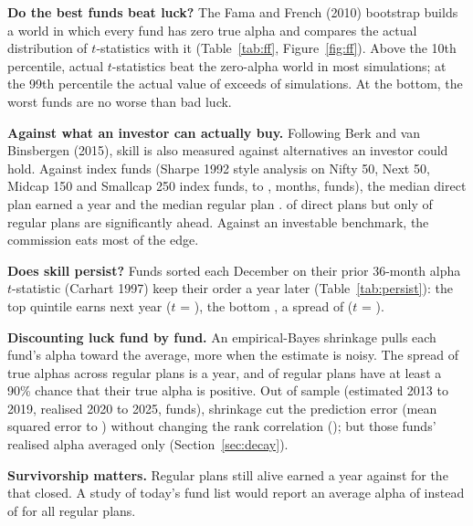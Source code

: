 \documentclass[11pt]{article}
\begin{document}
\textbf{Do the best funds beat luck?} The Fama and French (2010) bootstrap builds a world in which every fund has zero true alpha and compares the actual distribution of $t$-statistics with it (Table~\ref{tab:ff}, Figure~\ref{fig:ff}). Above the 10th percentile, actual $t$-statistics beat the zero-alpha world in most simulations; at the 99th percentile the actual value of \SkillFfRegPNineNineT{} exceeds \SkillFfRegPNineNineShareBelow{} of simulations. At the bottom, the worst funds are no worse than bad luck.

\textbf{Against what an investor can actually buy.} Following Berk and van Binsbergen (2015), skill is also measured against alternatives an investor could hold. Against index funds (Sharpe 1992 style analysis on Nifty 50, Next 50, Midcap 150 and Smallcap 250 index funds, \StyleStart{} to \StyleEnd, \StyleMonths{} months, \StyleDirFunds{} funds), the median direct plan earned \StyleDirMedianAlpha{} a year and the median regular plan \StyleRegMedianAlpha. \StyleDirShareSigPos{} of direct plans but only \StyleRegShareSigPos{} of regular plans are significantly ahead. Against an investable benchmark, the commission eats most of the edge.

\textbf{Does skill persist?} Funds sorted each December on their prior 36-month alpha $t$-statistic (Carhart 1997) keep their order a year later (Table~\ref{tab:persist}): the top quintile earns \SkillPersistTopAlpha{} next year ($t$ = \SkillPersistTopT), the bottom \SkillPersistBottomAlpha, a spread of \SkillPersistSpreadAlpha{} ($t$ = \SkillPersistSpreadT).

\textbf{Discounting luck fund by fund.} An empirical-Bayes shrinkage pulls each fund's alpha toward the average, more when the estimate is noisy. The spread of true alphas across regular plans is \SkillRegEbTau{} a year, and \SkillRegEbShareProbNineZero{} of regular plans have at least a 90\% chance that their true alpha is positive. Out of sample (estimated 2013 to 2019, realised 2020 to 2025, \SkillDirOosFunds{} funds), shrinkage cut the prediction error (mean squared error \SkillDirOosMseRaw{} to \SkillDirOosMseShrunk) without changing the rank correlation (\SkillDirOosRhoRaw); but those funds' realised alpha averaged only \SkillDirOosMeanLaterAlpha{} (Section~\ref{sec:decay}).

\textbf{Survivorship matters.} Regular plans still alive earned \SkillRegAlphaAlive{} a year against \SkillRegAlphaDead{} for the \SkillRegDeadFunds{} that closed. A study of today's fund list would report an average alpha of \SkillRegAlphaAlive{} instead of \SkillRegAlphaAll{} for all regular plans.
\end{document}
